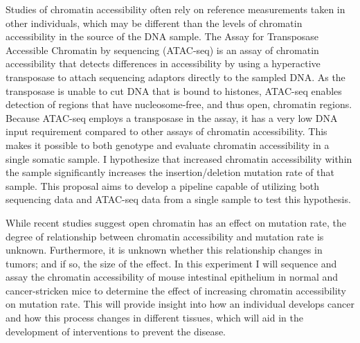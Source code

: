Studies of chromatin accessibility often rely on reference measurements taken in other individuals, which may be different than the levels of chromatin accessibility in the source of the DNA sample. The Assay for Transposase Accessible Chromatin by sequencing (ATAC-seq) is an assay of chromatin accessibility that detects differences in accessibility by using a hyperactive transposase to attach sequencing adaptors directly to the sampled DNA. As the transposase is unable to cut DNA that is bound to histones, ATAC-seq enables detection of regions that have nucleosome-free, and thus open, chromatin regions.
Because ATAC-seq employs a transposase in the assay, it has a very low DNA input requirement compared to other assays of chromatin accessibility. This makes it possible to both genotype and evaluate chromatin accessibility in a single somatic sample.
I hypothesize that increased chromatin accessibility within the sample significantly increases the insertion/deletion mutation rate of that sample.
This proposal aims to develop a pipeline capable of utilizing both sequencing data and ATAC-seq data from a single sample to test this hypothesis.

While recent studies suggest open chromatin has an effect on mutation rate, the degree of relationship between chromatin accessibility and mutation rate is unknown.
Furthermore, it is unknown whether this relationship changes in tumors; and if so, the size of the effect.
In this experiment I will sequence and assay the chromatin accessibility of mouse intestinal epithelium in normal and cancer-stricken mice to determine the effect of increasing chromatin accessibility on mutation rate.
This will provide insight into how an individual develops cancer and how this process changes in different tissues, which will aid in the development of interventions to prevent the disease.


